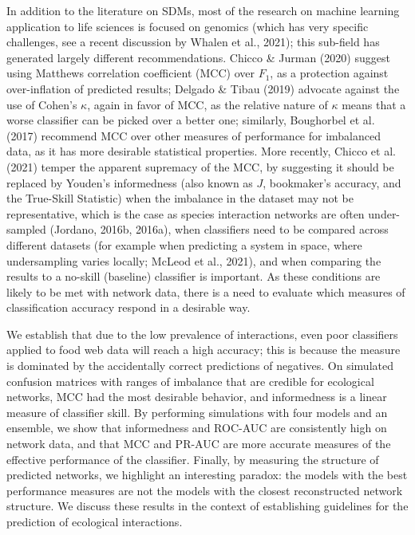 \documentclass[11pt]{article}
\begin{document}
In addition to the literature on SDMs, most of the research on machine
learning application to life sciences is focused on genomics (which has
very specific challenges, see a recent discussion by Whalen et al.,
2021); this sub-field has generated largely different recommendations.
Chicco \& Jurman (2020) suggest using Matthews correlation coefficient
(MCC) over \(F_1\), as a protection against over-inflation of predicted
results; Delgado \& Tibau (2019) advocate against the use of Cohen's
\(\kappa\), again in favor of MCC, as the relative nature of \(\kappa\)
means that a worse classifier can be picked over a better one;
similarly, Boughorbel et al. (2017) recommend MCC over other measures of
performance for imbalanced data, as it has more desirable statistical
properties. More recently, Chicco et al. (2021) temper the apparent
supremacy of the MCC, by suggesting it should be replaced by Youden's
informedness (also known as \(J\), bookmaker's accuracy, and the
True-Skill Statistic) when the imbalance in the dataset may not be
representative, which is the case as species interaction networks are
often under-sampled (Jordano, 2016b, 2016a), when classifiers need to be
compared across different datasets (for example when predicting a system
in space, where undersampling varies locally; McLeod et al., 2021), and
when comparing the results to a no-skill (baseline) classifier is
important. As these conditions are likely to be met with network data,
there is a need to evaluate which measures of classification accuracy
respond in a desirable way.

We establish that due to the low prevalence of interactions, even poor
classifiers applied to food web data will reach a high accuracy; this is
because the measure is dominated by the accidentally correct predictions
of negatives. On simulated confusion matrices with ranges of imbalance
that are credible for ecological networks, MCC had the most desirable
behavior, and informedness is a linear measure of classifier skill. By
performing simulations with four models and an ensemble, we show that
informedness and ROC-AUC are consistently high on network data, and that
MCC and PR-AUC are more accurate measures of the effective performance
of the classifier. Finally, by measuring the structure of predicted
networks, we highlight an interesting paradox: the models with the best
performance measures are not the models with the closest reconstructed
network structure. We discuss these results in the context of
establishing guidelines for the prediction of ecological interactions.
\end{document}
